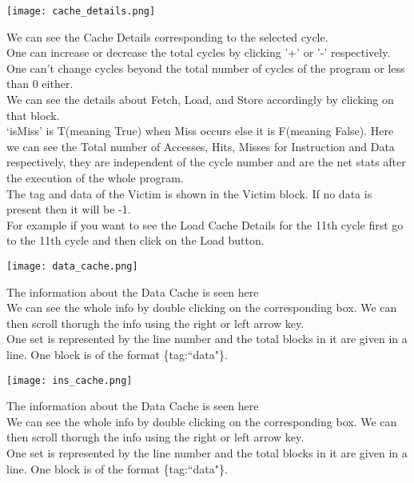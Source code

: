 \documentclass{article}
\begin{document}
\newpage
\begin{centering}
\texttt{[image: cache\_details.png]}\vspace{2cm}
\end{centering}
We can see the Cache Details corresponding to the selected cycle.\\
One can increase or decrease the total cycles by clicking '+' or '-' respectively. One can't change cycles beyond the total number of cycles of the program or less than 0 either.\\
We can see the details about Fetch, Load, and Store accordingly by clicking on that block.\\
`isMiss' is T(meaning True) when Miss occurs else it is F(meaning False).
Here we can see the Total number of Accesses, Hits, Misses for Instruction and Data respectively, they are independent of the cycle number and are the net stats after the execution of the whole program.\\
The tag and data of the Victim is shown in the Victim block. If no data is present then it will be -1.\\
For example if you want to see the Load Cache Details for the 11th cycle first go to the 11th cycle and then click on the Load button.\\
\newpage

\vspace{2cm}
\begin{centering}
\texttt{[image: data\_cache.png]}\vspace{2cm}
\end{centering}
The information about the Data Cache is seen here\\
We can see the whole info by double clicking on the corresponding box.
We can then scroll thorugh the info using the right or left arrow key.\\
One set is represented by the line number and the total blocks in it are given in a line. One block is of the format \{tag:``data"\}.\\

\newpage
\begin{centering}
\texttt{[image: ins\_cache.png]}\vspace{2cm}
\end{centering}
The information about the Data Cache is seen here\\
We can see the whole info by double clicking on the corresponding box.
We can then scroll thorugh the info using the right or left arrow key.\\
One set is represented by the line number and the total blocks in it are given in a line. One block is of the format \{tag:``data"\}.\\
\end{document}
